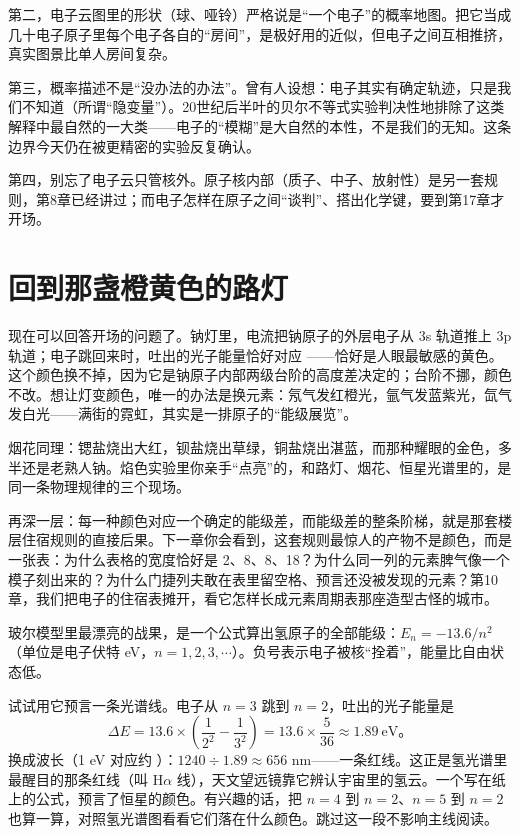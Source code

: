 第二，电子云图里的形状（球、哑铃）严格说是“一个电子”的概率地图。把它当成几十电子原子里每个电子各自的“房间”，是极好用的近似，但电子之间互相推挤，真实图景比单人房间复杂。

第三，概率描述不是“没办法的办法”。曾有人设想：电子其实有确定轨迹，只是我们不知道（所谓“隐变量”）。20世纪后半叶的贝尔不等式实验判决性地排除了这类解释中最自然的一大类——电子的“模糊”是大自然的本性，不是我们的无知。这条边界今天仍在被更精密的实验反复确认。

第四，别忘了电子云只管核外。原子核内部（质子、中子、放射性）是另一套规则，第8章已经讲过；而电子怎样在原子之间“谈判”、搭出化学键，要到第17章才开场。

\section{回到那盏橙黄色的路灯}

现在可以回答开场的问题了。钠灯里，电流把钠原子的外层电子从 3s 轨道推上 3p 轨道；电子跳回来时，吐出的光子能量恰好对应 ——恰好是人眼最敏感的黄色。这个颜色换不掉，因为它是钠原子内部两级台阶的高度差决定的；台阶不挪，颜色不改。想让灯变颜色，唯一的办法是换元素：氖气发红橙光，氩气发蓝紫光，氙气发白光——满街的霓虹，其实是一排原子的“能级展览”。

烟花同理：锶盐烧出大红，钡盐烧出草绿，铜盐烧出湛蓝，而那种耀眼的金色，多半还是老熟人钠。焰色实验里你亲手“点亮”的，和路灯、烟花、恒星光谱里的，是同一条物理规律的三个现场。

再深一层：每一种颜色对应一个确定的能级差，而能级差的整条阶梯，就是那套楼层住宿规则的直接后果。下一章你会看到，这套规则最惊人的产物不是颜色，而是一张表：为什么表格的宽度恰好是 2、8、8、18？为什么同一列的元素脾气像一个模子刻出来的？为什么门捷列夫敢在表里留空格、预言还没被发现的元素？第10章，我们把电子的住宿表摊开，看它怎样长成元素周期表那座造型古怪的城市。

\begin{tiaozhan}
玻尔模型里最漂亮的战果，是一个公式算出氢原子的全部能级：$E_n = -13.6/n^2$（单位是电子伏特 eV，$n=1,2,3,\cdots$）。负号表示电子被核“拴着”，能量比自由状态低。

试试用它预言一条光谱线。电子从 $n=3$ 跳到 $n=2$，吐出的光子能量是
\[\Delta E = 13.6\times\left(\frac{1}{2^2}-\frac{1}{3^2}\right) = 13.6\times\frac{5}{36} \approx 1.89\ \text{eV}。\]
换成波长（1 eV 对应约 ）：$1240 \div 1.89 \approx 656$ nm——一条红线。这正是氢光谱里最醒目的那条红线（叫 H$\alpha$ 线），天文望远镜靠它辨认宇宙里的氢云。一个写在纸上的公式，预言了恒星的颜色。有兴趣的话，把 $n=4$ 到 $n=2$、$n=5$ 到 $n=2$ 也算一算，对照氢光谱图看看它们落在什么颜色。跳过这一段不影响主线阅读。
\end{tiaozhan}

